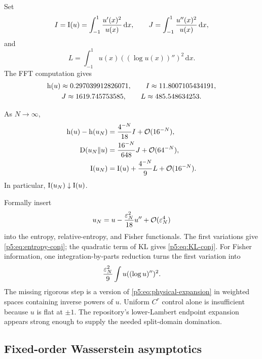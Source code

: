 \documentclass[11pt,oneside]{article}
\numberwithin{equation}{section}
\theoremstyle{definition}
\theoremstyle{remark}
\newcommand{\dd}{\,\mathrm d}
\newcommand{\bigO}{\mathcal O}
\begin{document}
Set
\begin{equation}
 I=\Fish(u)=\int_{-1}^{1}\frac{u'(x)^2}{u(x)}\dd x,
 \qquad
 J=\int_{-1}^{1}\frac{u''(x)^2}{u(x)}\dd x,
 \label{p5:eq:I-J}
\end{equation}
and
\begin{equation}
 L=\int_{-1}^{1}u(x)\left((\log u(x))''\right)^2\dd x.
 \label{p5:eq:L-info}
\end{equation}
The FFT computation gives
\begin{equation}
\begin{gathered}
 \operatorname{h}(u)\approx0.297039912826071,
 \qquad I\approx11.8007105434191,\\
 J\approx1619.745753585,
 \qquad L\approx485.548634253.
\end{gathered}
 \label{p5:eq:numeric-info-constants}
\end{equation}

\begin{conjecture}
As $N\to\infty$,
\begin{align}
 \Ent(u)-\Ent(u_N)
 &=\frac{4^{-N}}{18}I+\bigO(16^{-N}),
 \label{p5:eq:entropy-conj}\\
 \KL(u_N\Vert u)
 &=\frac{16^{-N}}{648}J+\bigO(64^{-N}),
 \label{p5:eq:KL-conj}\\
 \Fish(u_N)
 &=\Fish(u)+\frac{4^{-N}}9L+\bigO(16^{-N}).
 \label{p5:eq:fisher-conj}
\end{align}
In particular, $\operatorname{I}(u_N)\downarrow\operatorname{I}(u)$.
\end{conjecture}

\begin{proofidea}
Formally insert
\[
 u_N=u-\frac{\eps_N^2}{18}u''+\bigO(\eps_N^4)
\]
into the entropy, relative-entropy, and Fisher functionals.  The first variations give \eqref{p5:eq:entropy-conj}; the quadratic term of KL gives \eqref{p5:eq:KL-conj}.  For Fisher information, one integration-by-parts reduction turns the first variation into
\[
 \frac{\varepsilon_N^2}{9}\int u((\log u)'')^2.
\]
The missing rigorous step is a version of \eqref{p5:eq:physical-expansion} in weighted spaces containing inverse powers of $u$.  Uniform $C^r$ control alone is insufficient because $u$ is flat at $\pm1$.  The repository's lower-Lambert endpoint expansion appears strong enough to supply the needed split-domain domination.
\end{proofidea}

\subsection{Fixed-order Wasserstein asymptotics}
\end{document}
